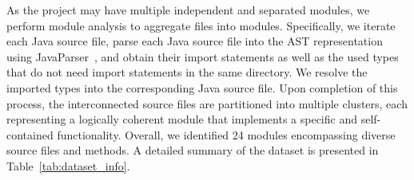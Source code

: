 As the project may have multiple independent and separated modules, we perform module analysis to aggregate files into modules. Specifically, we iterate each Java source file, parse each Java source file into the AST representation using JavaParser~\cite{javaparse}, and obtain their import statements as well as the used types that do not need import statements in the same directory. We resolve the imported types into the corresponding Java source file. Upon completion of this process, the interconnected source files are partitioned into multiple clusters, each representing a logically coherent module that implements a specific and self-contained functionality. Overall, we identified 24 modules encompassing diverse source files and methods. A detailed summary of the dataset is presented in Table~\ref{tab:dataset_info}.


